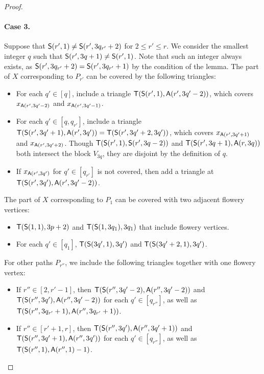 \begin{proof}
  \paragraph{Case 3.}
  Suppose that $\mathsf{S}(r', 1) \ne \mathsf{S}(r', 3q_{r'} + 2)$ for $2 \le r' \le r$.
  We consider the smallest integer $q$ such that $\mathsf{S}(r', 3q + 1) \ne \mathsf{S}(r', 1)$.
  Note that such an integer always exists, as $\mathsf{S}(r', 3q_{r'} + 2) = \mathsf{S}(r', 3q_{r'} + 1)$ by the condition of the lemma.
  The part of $X$ corresponding to $P_{r'}$ can be covered by the following triangles:
  \begin{itemize}
    \item For each $q' \in [q]$, include a triangle $\mathsf{T}(\mathsf{S}(r', 1), \mathsf{A}(r', 3q' - 2))$, which covers $x_{\mathsf{A}(r', 3q' - 2)}$ and $x_{\mathsf{A}(r', 3q' - 1)}$.
    \item For each $q' \in [q, q_{r'}]$, include a triangle $\mathsf{T}(\mathsf{S}(r', 3q' + 1), \mathsf{A}(r', 3q')) = \mathsf{T}(\mathsf{S}(r',3q' + 2, 3q'))$, which covers $x_{\mathsf{A}(r', 3q' + 1)}$ and $x_{\mathsf{A}(r', 3q' + 2)}$.
    Though $\mathsf{T}(\mathsf{S}(r', 1), \mathsf{S}(r', 3q - 2))$ and $\mathsf{T}(\mathsf{S}(r', 3q + 1), \mathsf{A}(r, 3q))$ both intersect the block $V_{3q}$, they are disjoint by the definition of $q$.
    \item If $x_{\mathsf{A}(r', 3q')}$ for $q' \in [q_{r'}]$ is not covered, then add a triangle at $\mathsf{T}(\mathsf{S}(r', 3q'), \mathsf{A}(r', 3q'-2))$.
  \end{itemize}
  The part of $X$ corresponding to $P_1$ can be covered with two adjacent flowery vertices:
  \begin{itemize}
    \item $\mathsf{T}(\mathsf{S}(1, 1), 3p+2)$ and $\mathsf{T}(\mathsf{S}(1, 3q_1), 3q_1)$ that include flowery vertices.
    \item For each $q' \in [q_1]$, $\mathsf{T}(\mathsf{S}(3q', 1), 3q')$ and $\mathsf{T}(\mathsf{S}(3q'+2, 1), 3q')$.
  \end{itemize}
  For other paths $P_{r''}$, we include the following triangles together with one flowery vertex:
  \begin{itemize}
    \item If $r'' \in [2, r' - 1]$, then $\mathsf{T}(\mathsf{S}(r'', 3q'-2), \mathsf{A}(r'', 3q'-2))$ and $\mathsf{T}(\mathsf{S}(r'', 3q'), \mathsf{A}(r'', 3q'-2))$ for each $q' \in [q_{r''}]$, as well as $\mathsf{T}(\mathsf{S}(r'', 3q_{r'}+1), \mathsf{A}(r'', 3q_{r'}+1))$.
    \item If $r'' \in [r' + 1, r]$, then $\mathsf{T}(\mathsf{S}(r'', 3q'), \mathsf{A}(r'', 3q'+1))$ and $\mathsf{T}(\mathsf{S}(r'', 3q'+1), \mathsf{A}(r'', 3q'))$ for each $q' \in [q_{r''}]$, as well as $\mathsf{T}(\mathsf{S}(r'', 1), \mathsf{A}(r'', 1) - 1)$.
  \end{itemize}


\end{proof}
